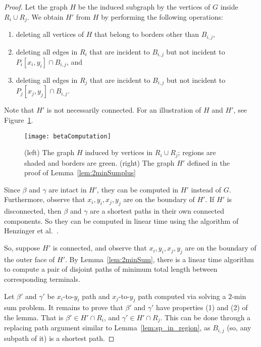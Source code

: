 \documentclass[11pt,twoside]{article}
\newcommand{\spath}[1]{P_{#1}}
\newcommand{\region}[1]{R_{#1}}
\newcommand{\border}[2]{B_{#1,#2}}
\begin{document}
\begin{proof}
Let the graph $H$ be the induced subgraph by the vertices of $G$ inside $\region{i} \cup \region{j}$.
We obtain $H'$ from $H$ by performing the following operations:
\begin{enumerate}
\item deleting all vertices of $H$ that belong to borders other than $\border{i}{j}$,
\item deleting all edges in $\region{i}$ that are incident to $\border{i}{j}$ but not incident to $\spath{i}[x_i, y_i] \cap \border{i}{j}$, and
\item deleting all edges in $\region{j}$ that are incident to $\border{i}{j}$ but not incident to $\spath{j}[x_j, y_j] \cap \border{i}{j}$.
\end{enumerate}
Note that $H'$ is not necessarily connected.  For an illustration of $H$ and $H'$, see Figure~\ref{fig:mincost}.

\begin{figure}[tbh]
  \centering
    \texttt{[image: betaComputation]}
      \caption{(left) The graph $H$ induced by vertices in $\region{i}\cup\region{j}$; regions are shaded and borders are green. (right) The graph $H'$ defined in the proof of Lemma~\ref{lem:2minSumplus}}
  \label{fig:mincost}
\end{figure}


Since $\beta$ and $\gamma$ are intact in $H'$, they can be computed in $H'$ instead of $G$.
Furthermore, observe that $x_i, y_i, x_j, y_j$ are on the boundary of $H'$.  If $H'$ is disconnected, then $\beta$ and $\gamma$ are a shortest paths in their own connected components.  So they can be computed in linear time using the algorithm of Henzinger et al.~\cite{henzinger1997planarShortestPaths}.

So, suppose $H'$ is connected, and observe that $x_i, y_i, x_j, y_j$ are on the boundary of the outer face of $H'$.  By Lemma~\ref{lem:2minSum}, there is a linear time algorithm to compute a pair of disjoint paths of minimum total length between corresponding terminals.

Let $\beta'$ and $\gamma'$ be $x_i$-to-$y_i$ path and $x_j$-to-$y_j$ path computed via solving a $2$-min sum problem. 
It remains to prove that $\beta'$ and $\gamma'$ have properties (1) and (2) of the lemma.
That is $\beta' \in H'\cap \region{i}$, and $\gamma' \in H'\cap\region{j}$.  This can be done through a replacing path argument similar to Lemma~\ref{lem:sp_in_region}, as $\border{i}{j}$ (so, any subpath of it) is a shortest path.
\end{proof}
\end{document}
